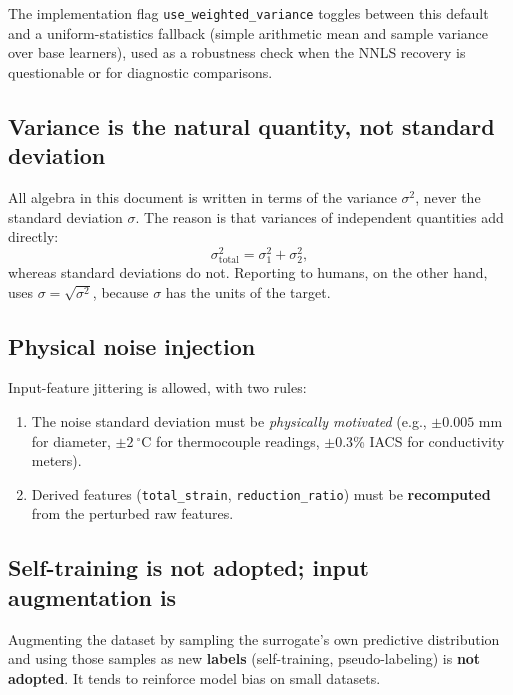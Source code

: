\documentclass[11pt,a4paper]{article}
\begin{document}
The implementation flag \texttt{use\_weighted\_variance} toggles between this default and a uniform-statistics fallback (simple arithmetic mean and sample variance over base learners), used as a robustness check when the NNLS recovery is questionable or for diagnostic comparisons.


\subsection{Variance is the natural quantity, not standard deviation}

\begin{cautionbox}
All algebra in this document is written in terms of the variance $\sigma^2$, never the standard deviation $\sigma$. The reason is that variances of independent quantities add directly:
\[
\sigma_{\text{total}}^2 = \sigma_1^2 + \sigma_2^2,
\]
whereas standard deviations do not. Reporting to humans, on the other hand, uses $\sigma = \sqrt{\sigma^2}$, because $\sigma$ has the units of the target.
\end{cautionbox}

\subsection{Physical noise injection}

\begin{decisionbox}
Input-feature jittering is allowed, with two rules:
\begin{enumerate}
    \item The noise standard deviation must be \emph{physically motivated} (e.g., $\pm 0.005$ mm for diameter, $\pm 2~^\circ$C for thermocouple readings, $\pm 0.3$\% IACS for conductivity meters).
    \item Derived features (\texttt{total\_strain}, \texttt{reduction\_ratio}) must be \textbf{recomputed} from the perturbed raw features.
\end{enumerate}
\end{decisionbox}

\subsection{Self-training is not adopted; input augmentation is}

Augmenting the dataset by sampling the surrogate's own predictive distribution and using those samples as new \textbf{labels} (self-training, pseudo-labeling) is \textbf{not adopted}. It tends to reinforce model bias on small datasets.
\end{document}

